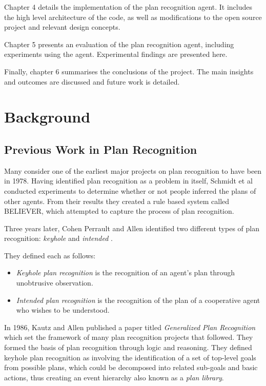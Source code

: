 \documentclass[parskip]{cs4rep}
\begin{document}
Chapter 4 details the implementation of the plan recognition agent. It includes the high level architecture of the code, as well as modifications to the open source project and relevant design concepts.  

Chapter 5 presents an evaluation of the plan recognition agent, including experiments using the agent. Experimental findings are presented here.

Finally, chapter 6 summarises the conclusions of the project. The main insights and outcomes are discussed and future work is detailed.

\chapter{Background}

\section{Previous Work in Plan Recognition}

Many consider one of the earliest major projects on plan recognition to have been in 1978. Having identified plan recognition as a problem in itself, Schmidt et al \cite{journals/ai/SchmidtSG78} conducted experiments to determine whether or not people inferred the plans of other agents. From their results they created a rule based system called BELIEVER, which attempted to capture the process of plan recognition. 

Three years later, Cohen Perrault and Allen identified two different types of plan recognition: \textit{keyhole} and \textit{intended} \cite{Cohen82a}. 

They defined each as follows:

\begin{itemize}
\item
\textit{Keyhole plan recognition} is the recognition of an agent's plan through unobtrusive observation.
\item
\textit{Intended plan recognition} is the recognition of the plan of a cooperative agent who wishes to be understood.
\end{itemize}

In 1986, Kautz and Allen published a paper titled \textit{Generalized Plan Recognition} \cite{conf/aaai/KautzA86} which set the framework of many plan recognition projects that followed. They formed the basis of plan recognition through logic and reasoning. They defined keyhole plan recognition as involving the identification of a set of top-level goals from possible plans, which could be decomposed into related sub-goals and basic actions, thus creating an event hierarchy also known as a \textit{plan library}. 
\end{document}
